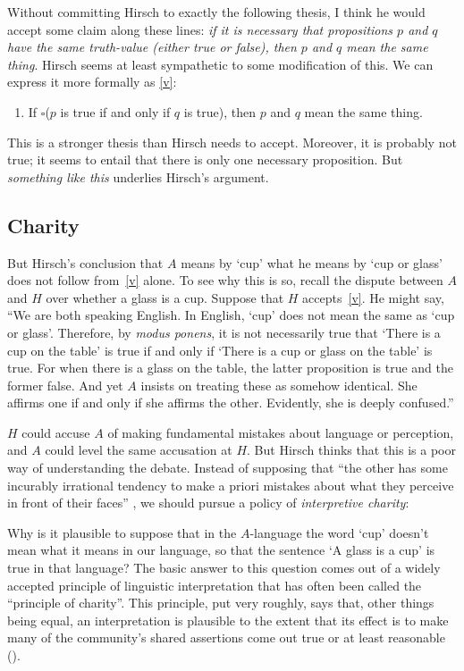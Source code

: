 \documentclass[12pt,twoside]{reedfancy}
\newenvironment{squote}{%
	\begin{spacing}{1}
	\begin{list}{}{%
	\setlength{\labelwidth}{0pt}%
	\rightmargin\leftmargin%
	}
	\item\relax
	}{%
	\end{list}%
	\end{spacing}
	}
\begin{document}
\begin{spacing}{1.25}
Without committing Hirsch to exactly the following thesis, I think he
would accept some claim along these lines: {\em if it is necessary
  that propositions $p$ and $q$ have the same truth-value (either true
  or false), then $p$ and $q$ mean the same thing}.  Hirsch seems at
least sympathetic to some modification of this.  We can express it
more formally as \ref{v}:
\begin{enumerate}[itemindent=25pt, label=(M)]
    \item If $\square$($p$ is true if and only if $q$ is true), then
      $p$ and $q$ mean the same thing. \label{v}
\end{enumerate}

This is a stronger thesis than Hirsch needs to accept.  Moreover, it
is probably not true; it seems to entail that there is only one
necessary proposition.  But {\em something like this} underlies
Hirsch's argument.

\subsection{Charity}
\label{charity}
But Hirsch's conclusion that $A$ means by `cup' what he means by `cup
or glass' does not follow from~\ref{v} alone.  To see why this is so,
recall the dispute between $A$ and $H$ over whether a glass is a cup.
Suppose that $H$ accepts~\ref{v}.  He might say, ``We are both
speaking English.  In English, `cup' does not mean the same as `cup or
glass'. Therefore, by {\em modus ponens}, it is not necessarily true
that `There is a cup on the table' is true if and only if `There is a
cup or glass on the table' is true.  For when there is a glass on the
table, the latter proposition is true and the former false.  And yet
$A$ insists on treating these as somehow identical.  She affirms one
if and only if she affirms the other.  Evidently, she is deeply
confused.''

$H$ could accuse $A$ of making fundamental mistakes about language or
perception, and $A$ could level the same accusation at $H$.  But
Hirsch thinks that this is a poor way of understanding the
debate.  Instead of supposing that ``the other has some incurably
irrational tendency to make a priori mistakes about what they perceive
in front of their faces'' \citep[78]{hirsch2005}, we should pursue a
policy of {\em interpretive charity}:

\begin{squote}
Why is it plausible to suppose that in the $A$-language the word `cup'
doesn't mean what it means in our language, so that the sentence `A
glass is a cup' is true in that language?  The basic answer to this
question comes out of a widely accepted principle of linguistic
interpretation that has often been called the ``principle of
charity''.  This principle, put very roughly, says that, other things
being equal, an interpretation is plausible to the extent that its
effect is to make many of the community's shared assertions come out
true or at least reasonable (\citeyear[71]{hirsch2005}).
\end{squote}


\end{spacing}
\end{document}
